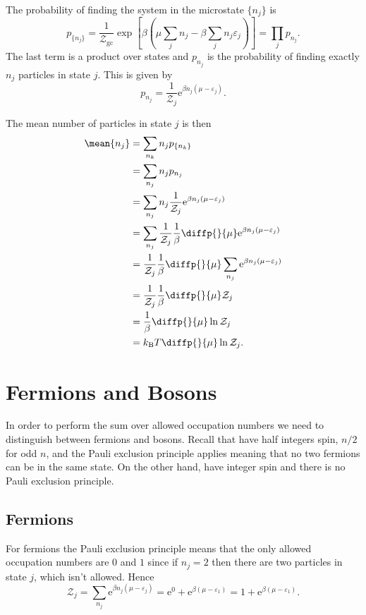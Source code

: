 \documentclass[fleqn]{NotesClass}
\newcommand*{\boltzmann}{k_{\mathrm{B}}}
\newcommand*{\gcpartition}{\mathcal{Z}_{\mathrm{gc}}}
\newcommand*{\e}{\mathrm{e}}
\begin{document}
    The probability of finding the system in the microstate \(\{n_j\}\) is
    \begin{equation}
        p_{\{n_j\}} = \frac{1}{\gcpartition} \exp\left[ \beta \left( \mu \sum_j n_j - \beta \sum_j n_j\varepsilon_j \right) \right] = \prod_j p_{n_j}.
    \end{equation}
    The last term is a product over states and \(p_{n_j}\) is the probability of finding exactly \(n_j\) particles in state \(j\).
    This is given by
    \begin{equation}
        p_{n_j} = \frac{1}{\mathcal{Z}_j} \e^{\beta n_j(\mu - \varepsilon_j)}.
    \end{equation}
    
    The mean number of particles in state \(j\) is then
    \begin{align}
        \mean{n_j} &= \sum_{n_k} n_j p_{\{n_k\}}\\
        &= \sum_{n_j} n_j p_{n_j}\\
        &= \sum_{n_j} n_j \frac{1}{\mathcal{Z}_j} \e^{\beta n_j(\mu - \varepsilon_j)}\\
        &= \sum_{n_j} \frac{1}{\mathcal{Z}_j} \frac{1}{\beta} \diffp{}{\mu} \e^{\beta n_j(\mu - \varepsilon_j)}\\
        &= \frac{1}{\mathcal{Z}_j} \frac{1}{\beta} \diffp{}{\mu} \sum_{n_j} \e^{\beta n_j(\mu - \varepsilon_j)}\\
        &= \frac{1}{\mathcal{Z}_j} \frac{1}{\beta} \diffp{}{\mu} \mathcal{Z}_j\\
        &= \frac{1}{\beta} \diffp{}{\mu} \ln \mathcal{Z}_j\\
        &= \boltzmann T \diffp{}{\mu} \ln \mathcal{Z}_j.
    \end{align}
    
    \section{Fermions and Bosons}
    In order to perform the sum over allowed occupation numbers we need to distinguish between fermions and bosons.
    Recall that  have half integers spin, \(n/2\) for odd \(n\), and the Pauli exclusion principle applies meaning that no two fermions can be in the same state.
    On the other hand,  have integer spin and there is no Pauli exclusion principle.
    
    \subsection{Fermions}
    For fermions the Pauli exclusion principle means that the only allowed occupation numbers are \(0\) and \(1\) since if \(n_j = 2\) then there are two particles in state \(j\), which isn't allowed.
    Hence
    \begin{equation}
        \mathcal{Z}_j = \sum_{n_j} \e^{\beta n_j(\mu - \varepsilon_j)} = \e^{0} + \e^{\beta (\mu - \varepsilon_1)} = 1 + \e^{\beta(\mu - \varepsilon_1)}.
    \end{equation}
    
\end{document}
